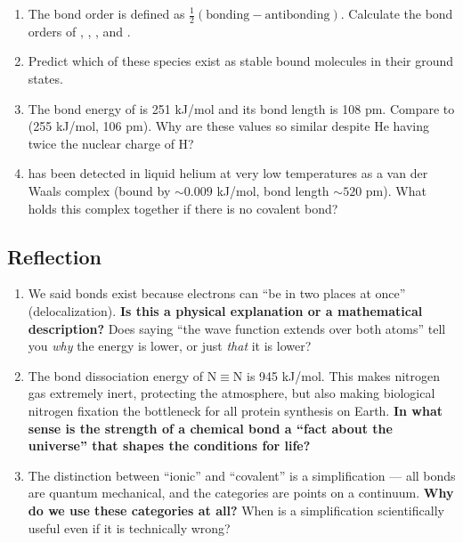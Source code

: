 \documentclass[12pt, a4paper]{book}
\begin{document}
\begin{deepbox}
\begin{enumerate}[label=\textbf{D\arabic*.}]
        \begin{enumerate}[label=(\alph*)]
          \item The bond order is defined as
                $\frac{1}{2}(\text{bonding} - \text{antibonding})$.
                Calculate the bond orders of ,
                , , and .
          \item Predict which of these species exist as stable
                bound molecules in their ground states.
          \item The bond energy of  is 251 kJ/mol
                and its bond length is 108 pm.
                Compare to  (255 kJ/mol, 106 pm).
                Why are these values so similar despite
                He having twice the nuclear charge of H?
          \item {} has been detected in liquid helium
                at very low temperatures as a van der Waals
                complex (bound by $\sim 0.009$ kJ/mol,
                bond length $\sim 520$ pm).
                What holds this complex together if
                there is no covalent bond?
        \end{enumerate}

\end{enumerate}
\end{deepbox}

\subsection*{Reflection}

\begin{reflectionbox}
\begin{enumerate}[label=\textbf{R\arabic*.}]
  \item We said bonds exist because electrons can
        ``be in two places at once'' (delocalization).
        \textbf{Is this a physical explanation or a
        mathematical description?}
        Does saying ``the wave function extends over both
        atoms'' tell you \emph{why} the energy is lower,
        or just \emph{that} it is lower?

  \item The bond dissociation energy of N$\equiv$N is
        945 kJ/mol.
        This makes nitrogen gas extremely inert,
        protecting the atmosphere, but also making
        biological nitrogen fixation the bottleneck
        for all protein synthesis on Earth.
        \textbf{In what sense is the strength of a chemical
        bond a ``fact about the universe'' that shapes
        the conditions for life?}

  \item The distinction between ``ionic'' and ``covalent''
        is a simplification --- all bonds are quantum
        mechanical, and the categories are points on
        a continuum.
        \textbf{Why do we use these categories at all?}
        When is a simplification scientifically useful
        even if it is technically wrong?
\end{enumerate}
\end{reflectionbox}
\end{document}

